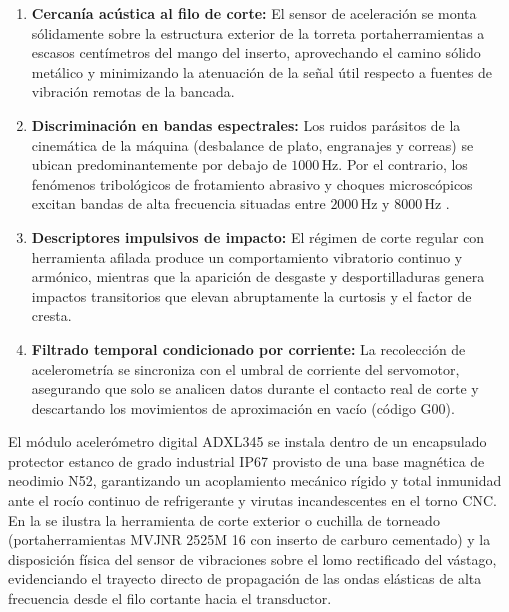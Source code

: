 \begin{enumerate}
    \item \textbf{Cercanía acústica al filo de corte:} El sensor de aceleración se monta sólidamente sobre la estructura exterior de la torreta portaherramientas a escasos centímetros del mango del inserto, aprovechando el camino sólido metálico y minimizando la atenuación de la señal útil respecto a fuentes de vibración remotas de la bancada.
    \item \textbf{Discriminación en bandas espectrales:} Los ruidos parásitos de la cinemática de la máquina (desbalance de plato, engranajes y correas) se ubican predominantemente por debajo de $1000\,\text{Hz}$. Por el contrario, los fenómenos tribológicos de frotamiento abrasivo y choques microscópicos excitan bandas de alta frecuencia situadas entre $2000\,\text{Hz}$ y $8000\,\text{Hz}$ \citep{trejo2010, jia2025}.
    \item \textbf{Descriptores impulsivos de impacto:} El régimen de corte regular con herramienta afilada produce un comportamiento vibratorio continuo y armónico, mientras que la aparición de desgaste y desportilladuras genera impactos transitorios que elevan abruptamente la curtosis y el factor de cresta.
    \item \textbf{Filtrado temporal condicionado por corriente:} La recolección de acelerometría se sincroniza con el umbral de corriente del servomotor, asegurando que solo se analicen datos durante el contacto real de corte y descartando los movimientos de aproximación en vacío (código G00).
\end{enumerate}

El módulo acelerómetro digital ADXL345 se instala dentro de un encapsulado protector estanco de grado industrial IP67 provisto de una base magnética de neodimio N52, garantizando un acoplamiento mecánico rígido y total inmunidad ante el rocío continuo de refrigerante y virutas incandescentes en el torno CNC. En la  se ilustra la herramienta de corte exterior o cuchilla de torneado (portaherramientas MVJNR 2525M 16 con inserto de carburo cementado) y la disposición física del sensor de vibraciones sobre el lomo rectificado del vástago, evidenciando el trayecto directo de propagación de las ondas elásticas de alta frecuencia desde el filo cortante hacia el transductor.



